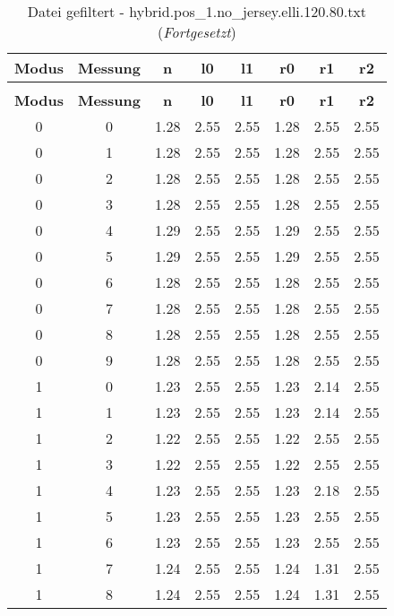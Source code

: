 \begin{longtable}{|c|c||c||c|c||c|c|c|}
	\caption{Datei gefiltert - hybrid.pos\_1.no\_jersey.elli.120.80.txt} \label{tab:hybrid.pos-1.no-jersey.elli.120.80.txt} \\ \hline
	\textbf{Modus} & \textbf{Messung} & \textbf{n} & \textbf{l0} & \textbf{l1} & \textbf{r0} & \textbf{r1} & \textbf{r2}\\ \hline
	\endfirsthead
	\caption[]{Datei gefiltert - hybrid.pos\_1.no\_jersey.elli.120.80.txt (\emph{Fortgesetzt})} \\ \hline
	\textbf{Modus} & \textbf{Messung} & \textbf{n} & \textbf{l0} & \textbf{l1} & \textbf{r0} & \textbf{r1} & \textbf{r2}\\ \hline
	\endhead
	0 & 0 & 1.28 & 2.55 & 2.55 & 1.28 & 2.55 & 2.55 \\ \hline
	0 & 1 & 1.28 & 2.55 & 2.55 & 1.28 & 2.55 & 2.55 \\ \hline
	0 & 2 & 1.28 & 2.55 & 2.55 & 1.28 & 2.55 & 2.55 \\ \hline
	0 & 3 & 1.28 & 2.55 & 2.55 & 1.28 & 2.55 & 2.55 \\ \hline
	0 & 4 & 1.29 & 2.55 & 2.55 & 1.29 & 2.55 & 2.55 \\ \hline
	0 & 5 & 1.29 & 2.55 & 2.55 & 1.29 & 2.55 & 2.55 \\ \hline
	0 & 6 & 1.28 & 2.55 & 2.55 & 1.28 & 2.55 & 2.55 \\ \hline
	0 & 7 & 1.28 & 2.55 & 2.55 & 1.28 & 2.55 & 2.55 \\ \hline
	0 & 8 & 1.28 & 2.55 & 2.55 & 1.28 & 2.55 & 2.55 \\ \hline
	0 & 9 & 1.28 & 2.55 & 2.55 & 1.28 & 2.55 & 2.55 \\ \hline
	1 & 0 & 1.23 & 2.55 & 2.55 & 1.23 & 2.14 & 2.55 \\ \hline
	1 & 1 & 1.23 & 2.55 & 2.55 & 1.23 & 2.14 & 2.55 \\ \hline
	1 & 2 & 1.22 & 2.55 & 2.55 & 1.22 & 2.55 & 2.55 \\ \hline
	1 & 3 & 1.22 & 2.55 & 2.55 & 1.22 & 2.55 & 2.55 \\ \hline
	1 & 4 & 1.23 & 2.55 & 2.55 & 1.23 & 2.18 & 2.55 \\ \hline
	1 & 5 & 1.23 & 2.55 & 2.55 & 1.23 & 2.55 & 2.55 \\ \hline
	1 & 6 & 1.23 & 2.55 & 2.55 & 1.23 & 2.55 & 2.55 \\ \hline
	1 & 7 & 1.24 & 2.55 & 2.55 & 1.24 & 1.31 & 2.55 \\ \hline
	1 & 8 & 1.24 & 2.55 & 2.55 & 1.24 & 1.31 & 2.55 \\ \hline

\end{longtable}
